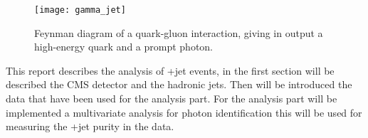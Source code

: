 \begin{figure}[h!]
  \centering
  \texttt{[image: gamma\_jet]}\\[1cm]
  \caption{Feynman diagram of a quark-gluon interaction, giving in output a high-energy quark and a prompt photon.}
  \label{gamma_jet}
\end{figure}

This report describes the analysis of \textgamma+jet events, in the first section will be described the CMS detector and
the hadronic jets. Then will be introduced the data that have been used for the analysis part.
For the analysis part will be implemented a multivariate analysis for photon identification this will be used for
measuring the \textgamma+jet purity in the data.


